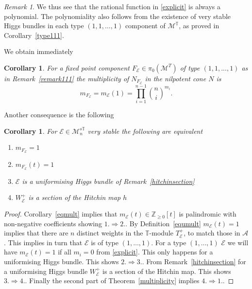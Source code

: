 \documentclass[12pt]{article}
\numberwithin{equation}{section}
\newtheorem{corollary}[theorem]{Corollary}
\theoremstyle{remark}
\newtheorem{remark}[theorem]{Remark}
\theoremstyle{definition}
\numberwithin{theorem}{section}
\def\calE{{\mathcal E}}
\def\M{{\mathcal{M}}}
\def\calA{{\mathcal{A}}}
\newcommand{\T}{{\mathbb{T}}}
\def\Z{\mathbb{Z}}
\renewcommand{\1}{\mathbbm{1}}
\begin{document}
\begin{remark}
	We thus see that the rational function in \eqref{explicit} is always a polynomial. The polynomiality also follows from the existence of very stable Higgs bundles in each type $(1,1,\dots,1)$  component of $\M^\T$, as proved in Corollary~\ref{type111}. 
\end{remark}

We obtain immediately  
\begin{corollary} \label{mult111} For a fixed point component $F_\calE\in \pi_0(\M^T)$  of type $(1,1,...,1)$ as in Remark~\ref{remark111} the multiplicity of $N_{F_\calE}$ in the nilpotent cone $N$ is $$m_{F_\calE}=m_\calE(1)=\prod_{i=1}^{n-1} %
	{n \choose i}^{m_i}.$$
\end{corollary}

Another consequence is the following
\begin{corollary} For $\calE\in \M^{s\T}_n$ very stable the following are equivalent \begin{enumerate}\item $m_{{F_\calE}}=1$ 		\item $m_{{F_\calE}}(t)=1$  \item $\calE$ is a uniformising Higgs bundle of Remark~\ref{hitchinsection} %
		
		\item $W^+_\calE$ is a section of the Hitchin map $h$ 
	\end{enumerate}
\end{corollary}
\begin{proof} Corollary~\ref{eqmult} implies that $m_{\calE}(t)\in \Z_{\geq0}[t]$ is palindromic with non-negative coefficients  showing $1.\Rightarrow 2.$.  By Definition~\ref{equmult}  $m_{\calE}(t)=1$ implies that there are $n$ distinct weights in the $\T$-module $T^+_\calE$, to match those in $\calA$.  This implies in turn that $\calE$ is of type $(1,\dots,1)$. For a type $(1,\dots,1)$ $\calE$ we will have $m_{\calE}(t)=1$ if all $m_i=0$ from \eqref{explicit}. This only happens for a  uniformising Higgs bundle. This shows $2.\Rightarrow 3.$.  From Remark~\ref{hitchinsection} for a uniformising Higgs bundle   $W^+_\calE$ is a section of the Hitchin map. This shows $3.\Rightarrow 4.$. Finally the second part of Theorem~\ref{multiplicity} implies $4.\Rightarrow1.$.
\end{proof}
\end{document}
